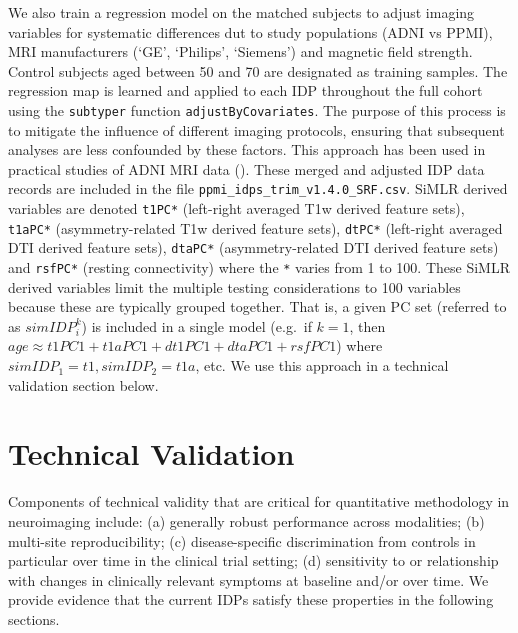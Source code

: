 \documentclass[
  table]{article}
\begin{document}
We also train a regression model on the matched subjects to adjust
imaging variables for systematic differences dut to study populations
(ADNI vs PPMI), MRI manufacturers (`GE', `Philips', `Siemens') and
magnetic field strength. Control subjects aged between 50 and 70 are
designated as training samples. The regression map is learned and
applied to each IDP throughout the full cohort using the
\texttt{subtyper} function \texttt{adjustByCovariates}. The purpose of
this process is to mitigate the influence of different imaging
protocols, ensuring that subsequent analyses are less confounded by
these factors. This approach has been used in practical studies of ADNI
MRI data (). These
merged and adjusted IDP data records are included in the file
\texttt{ppmi\_idps\_trim\_v1.4.0\_SRF.csv}. SiMLR derived variables are
denoted \texttt{t1PC*} (left-right averaged T1w derived feature sets),
\texttt{t1aPC*} (asymmetry-related T1w derived feature sets),
\texttt{dtPC*} (left-right averaged DTI derived feature sets),
\texttt{dtaPC*} (asymmetry-related DTI derived feature sets) and
\texttt{rsfPC*} (resting connectivity) where the \texttt{*} varies from
1 to 100. These SiMLR derived variables limit the multiple testing
considerations to 100 variables because these are typically grouped
together. That is, a given PC set (referred to as \(simIDP_i^k\)) is
included in a single model (e.g.~if \(k=1\), then
\(age \approx t1PC1 + t1aPC1 + dt1PC1 + dtaPC1 + rsfPC1\)) where
\(simIDP_1=t1, simIDP_2=t1a\), etc. We use this approach in a technical
validation section below.

\section{Technical Validation}\label{technical-validation}

Components of technical validity that are critical for quantitative
methodology in neuroimaging include: (a) generally robust performance
across modalities; (b) multi-site reproducibility; (c) disease-specific
discrimination from controls in particular over time in the clinical
trial setting; (d) sensitivity to or relationship with changes in
clinically relevant symptoms at baseline and/or over time. We provide
evidence that the current IDPs satisfy these properties in the following
sections.
\end{document}
